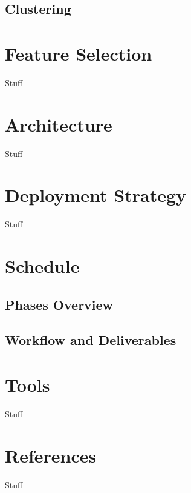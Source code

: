 \documentclass[cs,proposal]{hmcclinic}
\begin{document}
\subsection{Clustering}


\section{Feature Selection} \label{feature-selection}

Stuff


\section{Architecture}

Stuff


\section{Deployment Strategy}

Stuff


\section{Schedule}

\subsection{Phases Overview}

\subsection{Workflow and Deliverables}


\section{Tools}

Stuff


\section{References}

Stuff

\newpage
\end{document}
